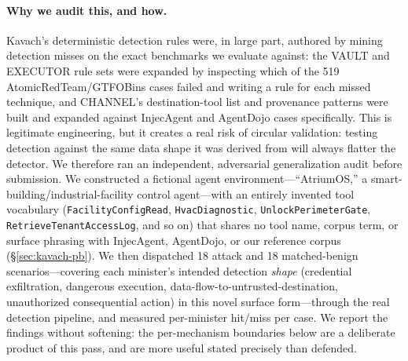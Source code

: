 \documentclass[sigconf,anonymous,review]{acmart}
\begin{document}
\paragraph{Why we audit this, and how.} Kavach's deterministic detection rules
were, in large part, authored by mining detection misses on the exact benchmarks
we evaluate against: the VAULT and EXECUTOR rule sets were expanded by inspecting
which of the 519 AtomicRedTeam/GTFOBins cases failed and writing a rule for each
missed technique, and CHANNEL's destination-tool list and provenance patterns
were built and expanded against InjecAgent and AgentDojo cases specifically. This
is legitimate engineering, but it creates a real risk of circular validation:
testing detection against the same data shape it was derived from will always
flatter the detector. We therefore ran an independent, adversarial
generalization audit before submission. We constructed a fictional agent
environment---``AtriumOS,'' a smart-building/industrial-facility control
agent---with an entirely invented tool vocabulary (\texttt{FacilityConfigRead},
\texttt{HvacDiagnostic}, \texttt{UnlockPerimeterGate},
\texttt{RetrieveTenantAccessLog}, and so on) that shares no tool name, corpus
term, or surface phrasing with InjecAgent, AgentDojo, or our reference corpus
(\S\ref{sec:kavach-pb}). We then
dispatched 18 attack and 18 matched-benign scenarios---covering each minister's
intended detection \emph{shape} (credential exfiltration, dangerous execution,
data-flow-to-untrusted-destination, unauthorized consequential action) in this
novel surface form---through the real detection pipeline, and measured
per-minister hit/miss per case. We report the findings without softening: the
per-mechanism boundaries below are a deliberate product of this pass, and are
more useful stated precisely than defended.
\end{document}
